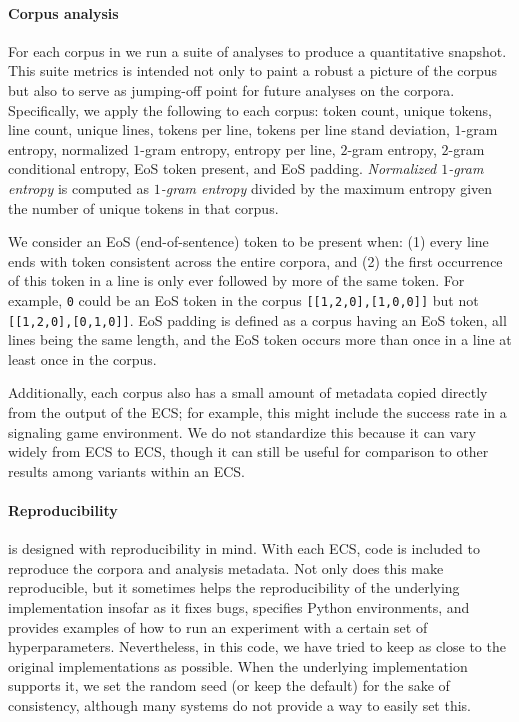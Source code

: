 \paragraph{Corpus analysis}
For each corpus in \theLib{} we run a suite of analyses to produce a quantitative snapshot.
This suite metrics is intended not only to paint a robust a picture of the corpus but also to serve as jumping-off point for future analyses on the corpora.
Specifically, we apply the following to each corpus:
  token count,
  unique tokens,
  line count,
  unique lines,
  tokens per line,
  tokens per line stand deviation,
  $1$-gram entropy,
  normalized $1$-gram entropy,
  entropy per line,
  $2$-gram entropy,
  $2$-gram conditional entropy,
  EoS token present,
  and EoS padding.
\emph{Normalized $1$-gram entropy} is computed as \emph{$1$-gram entropy} divided by the maximum entropy given the number of unique tokens in that corpus.

We consider an EoS (end-of-sentence) token to be present when:
  (1) every line ends with token consistent across the entire corpora,
  and (2) the first occurrence of this token in a line is only ever followed by more of the same token.
For example, \texttt{\small0} could be an EoS token in the corpus \texttt{\small[[1,2,0],[1,0,0]]} but not \texttt{\small[[1,2,0],[0,1,0]]}.
EoS padding is defined as a corpus having an EoS token, all lines being the same length, and the EoS token occurs more than once in a line at least once in the corpus.

Additionally, each corpus also has a small amount of metadata copied directly from the output of the ECS\@; for example, this might include the success rate in a signaling game environment.
We do not standardize this because it can vary widely from ECS to ECS, though it can still be useful for comparison to other results among variants within an ECS\@.

\paragraph{Reproducibility}
\theLib{} is designed with reproducibility in mind.
With each ECS, code is included to reproduce the corpora and analysis metadata.
Not only does this make \theLib{} reproducible, but it sometimes helps the reproducibility of the underlying implementation insofar as it fixes bugs, specifies Python environments, and provides examples of how to run an experiment with a certain set of hyperparameters.
Nevertheless, in this code, we have tried to keep as close to the original implementations as possible.
When the underlying implementation supports it, we set the random seed (or keep the default) for the sake of consistency, although many systems do not provide a way to easily set this.

